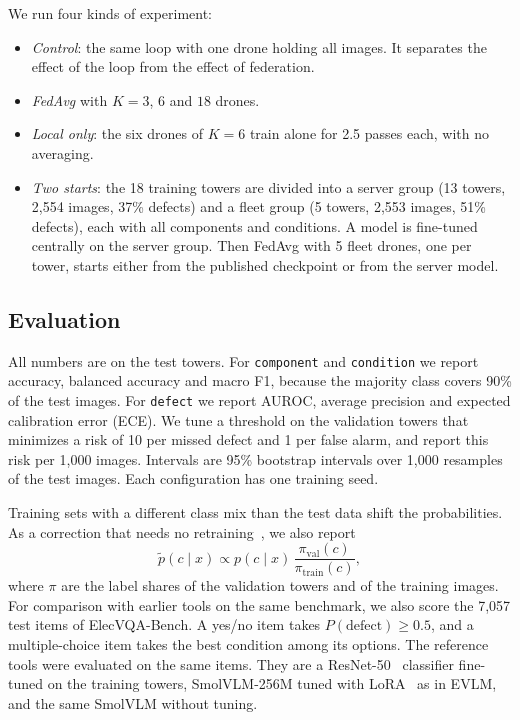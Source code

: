 \documentclass[preprint,12pt]{elsarticle}
\begin{document}
We run four kinds of experiment:
\begin{itemize}
\item \emph{Control}: the same loop with one drone holding all images. It separates the effect of the loop from the effect of federation.
\item \emph{FedAvg} with $K = 3$, $6$ and $18$ drones.
\item \emph{Local only}: the six drones of $K=6$ train alone for 2.5 passes each, with no averaging.
\item \emph{Two starts}: the 18 training towers are divided into a server group (13 towers, 2,554 images, 37\% defects) and a fleet group (5 towers, 2,553 images, 51\% defects), each with all components and conditions. A model is fine-tuned centrally on the server group. Then FedAvg with 5 fleet drones, one per tower, starts either from the published checkpoint or from the server model.
\end{itemize}

\subsection{Evaluation}

All numbers are on the test towers. For \texttt{component} and \texttt{condition} we report accuracy, balanced accuracy and macro F1, because the majority class covers 90\% of the test images. For \texttt{defect} we report AUROC, average precision and expected calibration error (ECE). We tune a threshold on the validation towers that minimizes a risk of 10 per missed defect and 1 per false alarm, and report this risk per 1,000 images. Intervals are 95\% bootstrap intervals over 1,000 resamples of the test images. Each configuration has one training seed.

Training sets with a different class mix than the test data shift the probabilities. As a correction that needs no retraining~\cite{saerens2002}, we also report
\begin{equation}\label{eq:prior}
\tilde p(c \mid x) \propto p(c \mid x)\,\frac{\pi_{\mathrm{val}}(c)}{\pi_{\mathrm{train}}(c)},
\end{equation}
where $\pi$ are the label shares of the validation towers and of the training images. For comparison with earlier tools on the same benchmark, we also score the 7,057 test items of ElecVQA-Bench. A yes/no item takes $P(\text{defect}) \ge 0.5$, and a multiple-choice item takes the best condition among its options. The reference tools were evaluated on the same items. They are a ResNet-50~\cite{resnet} classifier fine-tuned on the training towers, SmolVLM-256M tuned with LoRA~\cite{lora} as in EVLM, and the same SmolVLM without tuning.
\end{document}
